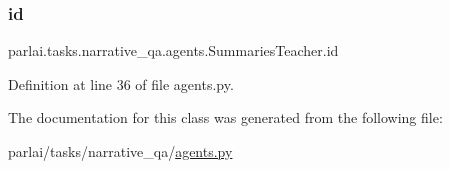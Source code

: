 \subsubsection{\texorpdfstring{id}{id}}
{\footnotesize\ttfamily parlai.\+tasks.\+narrative\+\_\+qa.\+agents.\+Summaries\+Teacher.\+id}



Definition at line 36 of file agents.\+py.



The documentation for this class was generated from the following file\+:\begin{DoxyCompactItemize}
\item 
parlai/tasks/narrative\+\_\+qa/\hyperlink{parlai_2tasks_2narrative__qa_2agents_8py}{agents.\+py}\end{DoxyCompactItemize}
